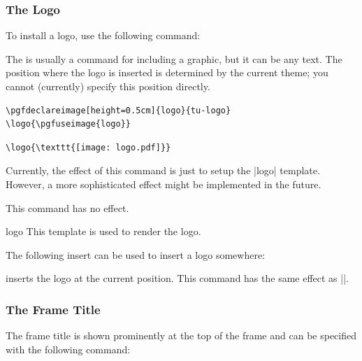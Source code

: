 \subsubsection{The Logo}

To install a logo, use the following command:

\begin{command}{\logo{}}
  The  is usually a command for including a graphic, but it can be any text. The position where the logo is inserted is determined by the current theme; you cannot (currently) specify this position directly.

  \example
\begin{verbatim}
\pgfdeclareimage[height=0.5cm]{logo}{tu-logo}
\logo{\pgfuseimage{logo}}
\end{verbatim}

  \example
\begin{verbatim}
\logo{\texttt{[image: logo.pdf]}}
\end{verbatim}

  Currently, the effect of this command is just to setup the |logo| template. However, a more sophisticated effect might be implemented in the future.

  \articlenote
  This command has no effect.

  \begin{element}{logo}\yes\yes\yes
    This template is used to render the logo.
  \end{element}

  The following insert can be used to insert a logo somewhere:
  \begin{itemize}
    \iteminsert{\insertlogo}
    inserts the logo at the current position. This command has the same effect as ||.
  \end{itemize}
\end{command}

\subsubsection{The Frame Title}

The frame title is shown prominently at the top of the frame and can be specified with the following command:

